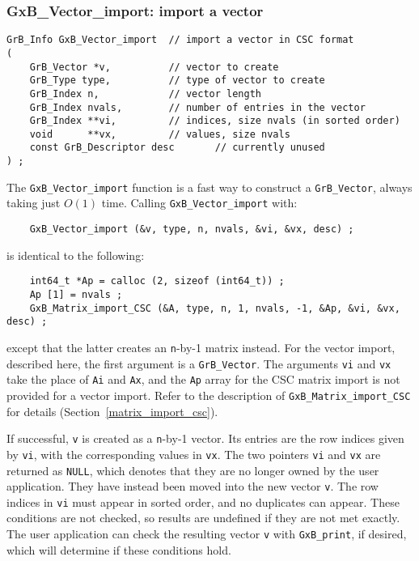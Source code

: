 \documentclass[12pt]{article}
\begin{document}
\newpage
\subsubsection{{\sf GxB\_Vector\_import:}        import a vector}
\label{vector_import}

\begin{mdframed}[userdefinedwidth=6in]
{\footnotesize
\begin{verbatim}
GrB_Info GxB_Vector_import  // import a vector in CSC format
(
    GrB_Vector *v,          // vector to create
    GrB_Type type,          // type of vector to create
    GrB_Index n,            // vector length
    GrB_Index nvals,        // number of entries in the vector
    GrB_Index **vi,         // indices, size nvals (in sorted order)
    void      **vx,         // values, size nvals
    const GrB_Descriptor desc       // currently unused
) ;
\end{verbatim}
} \end{mdframed}

The \verb'GxB_Vector_import' function is a fast way to construct a
\verb'GrB_Vector', always taking just $O(1)$ time.  Calling
\verb'GxB_Vector_import' with:

{\footnotesize
\begin{verbatim}
    GxB_Vector_import (&v, type, n, nvals, &vi, &vx, desc) ;
\end{verbatim}}

is identical to the following:

{\footnotesize
\begin{verbatim}
    int64_t *Ap = calloc (2, sizeof (int64_t)) ;
    Ap [1] = nvals ;
    GxB_Matrix_import_CSC (&A, type, n, 1, nvals, -1, &Ap, &vi, &vx, desc) ;
\end{verbatim}}

\noindent
except that the latter creates an \verb'n'-by-1 matrix instead.  For the vector
import, described here, the first argument is a \verb'GrB_Vector'.  The
arguments \verb'vi' and \verb'vx' take the place of \verb'Ai' and \verb'Ax',
and the \verb'Ap' array for the CSC matrix import is not provided for a vector
import.  Refer to the description of \verb'GxB_Matrix_import_CSC' for details
(Section~\ref{matrix_import_csc}).

If successful, \verb'v' is created as a \verb'n'-by-1 vector.  Its entries are
the row indices given by \verb'vi', with the corresponding values in \verb'vx'.
The two pointers \verb'vi' and \verb'vx' are returned as \verb'NULL', which
denotes that they are no longer owned by the user application.  They have
instead been moved into the new vector \verb'v'.  The row indices in \verb'vi'
must appear in sorted order, and no duplicates can appear.  These conditions
are not checked, so results are undefined if they are not met exactly.  The
user application can check the resulting vector \verb'v' with \verb'GxB_print',
if desired, which will determine if these conditions hold.
\end{document}
